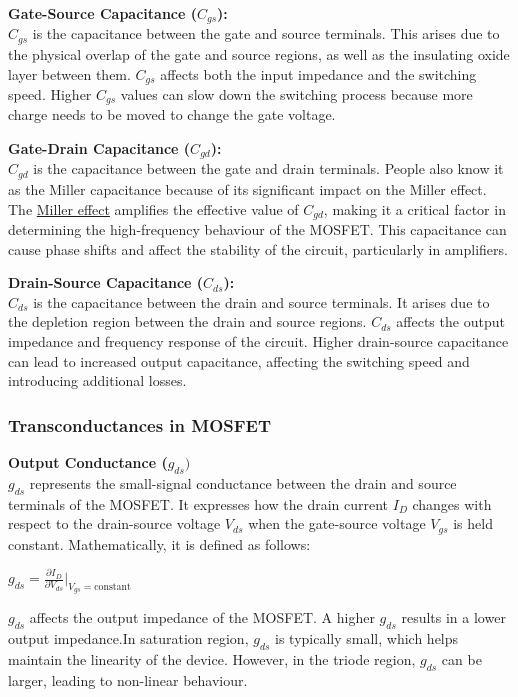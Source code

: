 \documentclass[
  letterpaper,
]{scrbook}
\begin{document}
\textbf{Gate-Source Capacitance (\(C_{gs}\)):}\\
\(C_{gs}\) is the capacitance between the gate and source terminals.
This arises due to the physical overlap of the gate and source regions,
as well as the insulating oxide layer between them. \(C_{gs}\) affects
both the input impedance and the switching speed. Higher \(C_{gs}\)
values can slow down the switching process because more charge needs to
be moved to change the gate voltage.

\textbf{Gate-Drain Capacitance (\(C_{gd}\)):}\\
\(C_{gd}\) is the capacitance between the gate and drain terminals.
People also know it as the Miller capacitance because of its significant
impact on the Miller effect. The
\href{https://en.wikipedia.org/wiki/Miller_effect}{Miller effect}
amplifies the effective value of \(C_{gd}\), making it a critical factor
in determining the high-frequency behaviour of the MOSFET. This
capacitance can cause phase shifts and affect the stability of the
circuit, particularly in amplifiers.

\textbf{Drain-Source Capacitance (\(C_{ds}\)):}\\
\(C_{ds}\) is the capacitance between the drain and source terminals. It
arises due to the depletion region between the drain and source regions.
\(C_{ds}\) affects the output impedance and frequency response of the
circuit. Higher drain-source capacitance can lead to increased output
capacitance, affecting the switching speed and introducing additional
losses.

\subsubsection{Transconductances in
MOSFET}\label{transconductances-in-mosfet}

\textbf{Output Conductance (\(g_{ds})\)}\\
\(g_{ds}\) represents the small-signal conductance between the drain and
source terminals of the MOSFET. It expresses how the drain current
\(I_D\) changes with respect to the drain-source voltage \(V_{ds}\) when
the gate-source voltage \(V_{gs}\) is held constant. Mathematically, it
is defined as follows:

\(g_{ds}=\frac{\partial I_D}{\partial V_{ds}}\bigg|_{V_{gs}=\text{constant}}\)

\(g_{ds}\) affects the output impedance of the MOSFET. A higher
\(g_{ds}\) results in a lower output impedance.In saturation region,
\(g_{ds}\) is typically small, which helps maintain the linearity of the
device. However, in the triode region, \(g_{ds}\) can be larger, leading
to non-linear behaviour.
\end{document}
